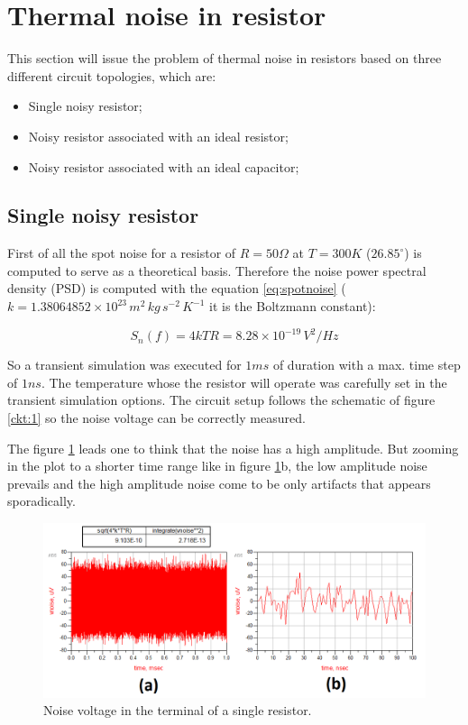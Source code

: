 \section{Thermal noise in resistor}

This section will issue the problem of thermal noise in resistors based on three different circuit topologies, which are:

\begin{itemize}
    \item Single noisy resistor;
    \item Noisy resistor associated with an ideal resistor;
    \item Noisy resistor associated with an ideal capacitor;
\end{itemize}

\subsection{Single noisy resistor}

First of all the spot noise for a resistor of $R = 50 \Omega$ at $T = 300K$ ($26.85^{\circ}$) is computed to serve as a theoretical basis. Therefore the noise power spectral density (PSD) is computed with the equation \ref{eq:spotnoise} ($k = 1.38064852 \times 10^{23} \, m^2 \, kg \, s^{-2} \, K^{-1}$ it is the Boltzmann constant):

\begin{equation} \label{eq:spotnoise}
    S_n(f) = 4 k T R = 8.28 \times 10^{-19} \, V^2/Hz
\end{equation}

So a transient simulation was executed for $1 ms$ of duration with a max. time step of $1 ns$. The temperature whose the resistor will operate was carefully set in the transient simulation options. The circuit setup follows the schematic of figure \ref{ckt:1} so the noise voltage can be correctly measured.



The figure \ref{fig:trans1} leads one to think that the noise has a high amplitude. But zooming in the plot to a shorter time range like in figure \ref{fig:trans1}b, the low amplitude noise prevails and the high amplitude noise come to be only artifacts that appears sporadically.

\begin{figure}[H] 
\centering
\includegraphics[width=13cm]{images/vnoise_trans.png}
\caption{Noise voltage in the terminal of a single resistor.}
\label{fig:trans1} 
\end{figure}

